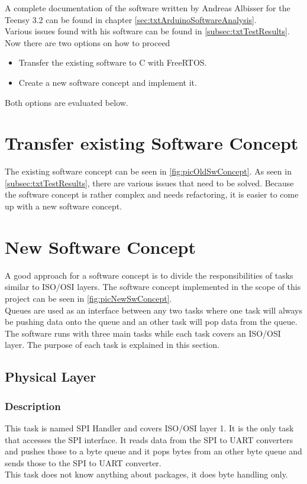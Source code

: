%
A complete documentation of the software written by Andreas Albisser for the Teensy 3.2 can be found in chapter \autoref{sec:txtArduinoSoftwareAnalysis}.\\
Various issues found with his software can be found in \autoref{subsec:txtTestResults}.\\
Now there are two options on how to proceed
\begin{itemize}
    \item Transfer the existing software to C with FreeRTOS.
    \item Create a new software concept and implement it.
\end{itemize}
Both options are evaluated below.
%
%
\section{Transfer existing Software Concept}
The existing software concept can be seen in \autoref{fig:picOldSwConcept}. As seen in \autoref{subsec:txtTestResults}, there are various issues that need to be solved. Because the software concept is rather complex and needs refactoring, it is easier to come up with a new software concept.
%
\section{New Software Concept}%
%
%
A good approach for a software concept is to divide the responsibilities of tasks similar to ISO/OSI layers. 
The software concept implemented in the scope of this project can be seen in \autoref{fig:picNewSwConcept}.\\
Queues are used as an interface between any two tasks where one task will always be pushing data onto the queue and an other task will pop data from the queue.\\
The software runs with three main tasks while each task covers an ISO/OSI layer. The purpose of each task is explained in this section.
%
%
\subsection{Physical Layer}
\subsubsection{Description}
This task is named SPI Handler and covers ISO/OSI layer 1. It is the only task that accesses the SPI interface. It reads data from the SPI to UART converters and pushes those to a byte queue and it pops bytes from an other byte queue and sends those to the SPI to UART converter.\\
This task does not know anything about packages, it does byte handling only.
